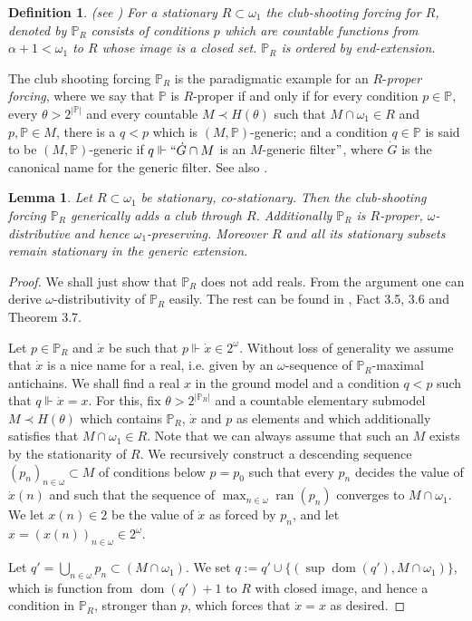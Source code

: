 \documentclass[a4paper,11pt]{article}
\newtheorem{lemma}[theorem]{Lemma}
\newtheorem{definition}[theorem]{Definition}
\newcommand{\forceP}{\mathbb{P}}
\begin{document}
\begin{definition}(see \cite{BHK})
 For a stationary $R \subset \omega_1$ the club-shooting forcing for $R$, denoted by $\forceP_R$ consists
 of conditions $p$ which are countable functions from $\alpha+1 <\omega_1$ to $R$ whose image is a closed set. $\forceP_R$ is ordered by end-extension.
 \end{definition}
The club shooting forcing $\forceP_R$ is the paradigmatic example for an $R$-\emph{proper forcing}, where we say that $\forceP$ is $R$-proper if and only if for every condition $p \in \forceP$, every $\theta > 2^{| \forceP|}$ and every countable $M \prec H(\theta)$ such that $M \cap \omega_1 \in R$ and $p, \forceP \in M$, there is a $q<p$ which is $(M, \forceP)$-generic; and a condition $q \in \forceP$ is said to be $(M,\forceP)$-generic if $q \Vdash ``\dot{G} \cap M$ is an $M$-generic filter$"$, where $\dot{G}$ is the canonical name for the generic filter.  See also \cite{Goldstern}. 
\begin{lemma}
 Let $R\subset \omega_1$ be stationary, co-stationary. Then the club-shooting forcing $\forceP_R$ generically adds a club through $R $. Additionally $\forceP_R$ is $R$-proper, $\omega$-distributive and
 hence $\omega_1$-preserving. Moreover $R$ and all its stationary subsets remain stationary in the generic extension. 
\end{lemma}
\begin{proof}
We shall just show that $\forceP_R$ does not add reals. From the argument one can derive $\omega$-distributivity of $\forceP_R$ easily. The rest can be found in \cite{Goldstern}, Fact 3.5, 3.6 and Theorem 3.7. 

Let $p \in \forceP_R$ and $\dot{x}$ be such that $p \Vdash \dot{x} \in 2^{\omega}$. Without loss of generality we assume that $\dot{x}$ is a nice name for a real, i.e. given by an $\omega$-sequence of $\forceP_R$-maximal antichains. We shall find a real $x$ in the ground model and a condition $q < p$ such that $q \Vdash \dot{x}=x$. For this, fix $\theta > 2^{|\forceP_R|}$ and a countable elementary submodel $M \prec H(\theta)$ which contains $\forceP_R$, $\dot{x}$ and $p$ as elements and which additionally satisfies that $M \cap \omega_1  \in R$. Note that we can always assume that such an $M$ exists by the stationarity of $R$. We recursively construct a descending sequence $(p_n)_{n \in \omega} \subset M$ of conditions below $p=p_0$ such that every $p_n$ decides the value of $\dot{x}(n)$ and such that the sequence of $\operatorname{max}_{n \in \omega} \operatorname{ran}(p_n)$  converges to $M \cap \omega_1$.
We let $x(n) \in 2$ be the value of $\dot{x}$ as forced by $p_n$, and let $x= (x(n))_{n \in \omega} \in 2^{\omega}$.

Let $q'=\bigcup_{n \in \omega} p_n \subset (M \cap \omega_1)$. We set $q:= q' \cup \{ (\operatorname{sup} \operatorname{dom} (q'), M \cap \omega_1) \}$, which is function from $\operatorname{dom} (q') +1$ to $R$ with closed image, and hence a condition in $\forceP_R$, stronger than $p$,  which forces that $\dot{x} =x$ as desired.

\end{proof}
\end{document}

